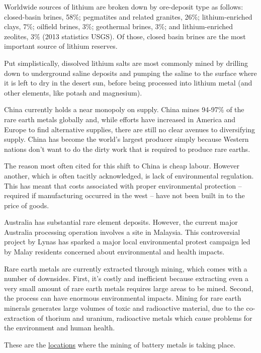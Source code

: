\documentclass[
]{book}
\begin{document}
Worldwide sources of lithium are broken down by ore-deposit type as follows: closed-basin brines, 58\%; pegmatites and related granites, 26\%; lithium-enriched clays, 7\%; oilfield brines, 3\%; geothermal brines, 3\%; and lithium-enriched zeolites, 3\% (2013 statistics USGS). Of those, closed basin brines are the most important source of lithium reserves.

Put simplistically, dissolved lithium salts are most commonly mined by drilling down to underground saline deposits and pumping the saline to the surface where it is left to dry in the desert sun, before being processed into lithium metal (and other elements, like potash and magnesium).

China currently holds a near monopoly on supply. China mines 94-97\% of the rare earth metals globally and, while efforts have increased in America and Europe to find alternative supplies, there are still no clear avenues to diversifying supply. China has become the world's largest producer simply because Western nations don't want to do the dirty work that is required to produce rare earths.

The reason most often cited for this shift to China is cheap labour. However another, which is often tacitly acknowledged, is lack of environmental regulation. This has meant that costs associated with proper environmental protection -- required if manufacturing occurred in the west -- have not been built in to the price of goods.

Australia has substantial rare element deposits. However, the current major Australia processing operation involves a site in Malaysia. This controversial project by Lynas has sparked a major local environmental protest campaign led by Malay residents concerned about environmental and health impacts.

Rare earth metals are currently extracted through mining, which comes with a number of downsides. First, it's costly and inefficient because extracting even a very small amount of rare earth metals requires large areas to be mined. Second, the process can have enormous environmental impacts. Mining for rare earth minerals generates large volumes of toxic and radioactive material, due to the co-extraction of thorium and uranium, radioactive metals which cause problems for the environment and human health.

These are the \href{https://www.mining.com/web/ranked-top-25-nations-producing-battery-metals-for-the-ev-supply-chain/}{locations} where the mining of battery metals is taking place.
\end{document}
